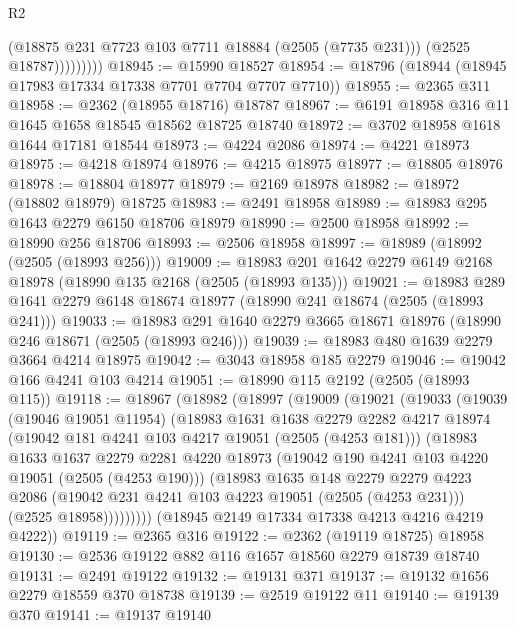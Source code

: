 \begin{lexlean}{R2}
\begin{coremodule}
                    (@18875 @231 @7723 @103 @7711 @18884 (@2505 (@7735 @231)))
                    (@2525 @18787)))))))))
@18945 := @15990 @18527
@18954 := @18796 (@18944 (@18945 @17983 @17334 @17338 @7701 @7704 @7707 @7710))
@18955 := @2365 @311
@18958 := @2362 (@18955 @18716) @18787
@18967 := @6191 @18958 @316 @11 @1645 @1658 @18545 @18562 @18725 @18740
@18972 := @3702 @18958 @1618 @1644 @17181 @18544
@18973 := @4224 @2086
@18974 := @4221 @18973
@18975 := @4218 @18974
@18976 := @4215 @18975
@18977 := @18805 @18976
@18978 := @18804 @18977
@18979 := @2169 @18978
@18982 := @18972 (@18802 @18979) @18725
@18983 := @2491 @18958
@18989 := @18983 @295 @1643 @2279 @6150 @18706 @18979
@18990 := @2500 @18958
@18992 := @18990 @256 @18706
@18993 := @2506 @18958
@18997 := @18989 (@18992 (@2505 (@18993 @256)))
@19009 := @18983 @201 @1642 @2279 @6149 @2168 @18978 (@18990 @135 @2168 (@2505 (@18993 @135)))
@19021 := @18983 @289 @1641 @2279 @6148 @18674 @18977 (@18990 @241 @18674 (@2505 (@18993 @241)))
@19033 := @18983 @291 @1640 @2279 @3665 @18671 @18976 (@18990 @246 @18671 (@2505 (@18993 @246)))
@19039 := @18983 @480 @1639 @2279 @3664 @4214 @18975
@19042 := @3043 @18958 @185 @2279
@19046 := @19042 @166 @4241 @103 @4214
@19051 := @18990 @115 @2192 (@2505 (@18993 @115))
@19118 := @18967
    (@18982
      (@18997
        (@19009
          (@19021
            (@19033
              (@19039
                (@19046 @19051 @11954)
                (@18983
                  @1631
                  @1638
                  @2279
                  @2282
                  @4217
                  @18974
                  (@19042 @181 @4241 @103 @4217 @19051 (@2505 (@4253 @181)))
                  (@18983
                    @1633
                    @1637
                    @2279
                    @2281
                    @4220
                    @18973
                    (@19042 @190 @4241 @103 @4220 @19051 (@2505 (@4253 @190)))
                    (@18983
                      @1635
                      @148
                      @2279
                      @2279
                      @4223
                      @2086
                      (@19042 @231 @4241 @103 @4223 @19051 (@2505 (@4253 @231)))
                      (@2525 @18958)))))))))
      (@18945 @2149 @17334 @17338 @4213 @4216 @4219 @4222))
@19119 := @2365 @316
@19122 := @2362 (@19119 @18725) @18958
@19130 := @2536 @19122 @882 @116 @1657 @18560 @2279 @18739 @18740
@19131 := @2491 @19122
@19132 := @19131 @371
@19137 := @19132 @1656 @2279 @18559 @370 @18738
@19139 := @2519 @19122 @11
@19140 := @19139 @370
@19141 := @19137 @19140

\end{coremodule}
\end{lexlean}
